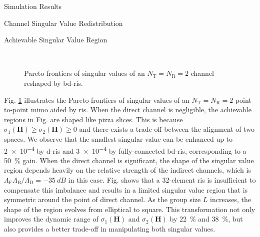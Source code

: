 \documentclass[journal]{IEEEtran}
\begin{document}
\begin{section}{Simulation Results}
	\begin{subsection}{Channel Singular Value Redistribution}
		\begin{subsubsection}{Achievable Singular Value Region}
			\begin{figure}[!t]
				\centering
				\\
				\caption{Pareto frontiers of singular values of an $N_\mathrm{T}=N_\mathrm{R}=2$ channel reshaped by \gls{bd}-\gls{ris}.}
				\label{fg:singular_pareto}
			\end{figure}
			Fig. \ref{fg:singular_pareto} illustrates the Pareto frontiers of singular values of an $N_\mathrm{T}=N_\mathrm{R}=2$ point-to-point \gls{mimo} aided by \gls{ris}.
			When the direct channel is negligible, the achievable regions in Fig.  are shaped like pizza slices.
			This is because $\sigma_1(\mathbf{H}) \ge \sigma_2(\mathbf{H}) \ge 0$ and there exists a trade-off between the alignment of two spaces.
			We observe that the smallest singular value can be enhanced up to \num{2e-4} by \gls{d}-\gls{ris} and \num{3e-4} by fully-connected \gls{bd}-\gls{ris}, corresponding to a \qty{50}{\percent} gain.
			When the direct channel is significant, the shape of the singular value region depends heavily on the relative strength of the indirect channels, which is $\Lambda_\mathrm{F}\Lambda_\mathrm{B}/\Lambda_\mathrm{D}=\qty{-35}{dB}$ in this case.
			Fig.  shows that a 32-element \gls{ris} is insufficient to compensate this imbalance and results in a limited singular value region that is symmetric around the point of direct channel.
			As the group size $L$ increases, the shape of the region evolves from elliptical to square.
			This transformation not only improves the dynamic range of $\sigma_1(\mathbf{H})$ and $\sigma_2(\mathbf{H})$ by \qty{22}{\percent} and \qty{38}{\percent}, but also provides a better trade-off in manipulating both singular values.

\end{subsubsection}
\end{subsection}
\end{section}
\end{document}
